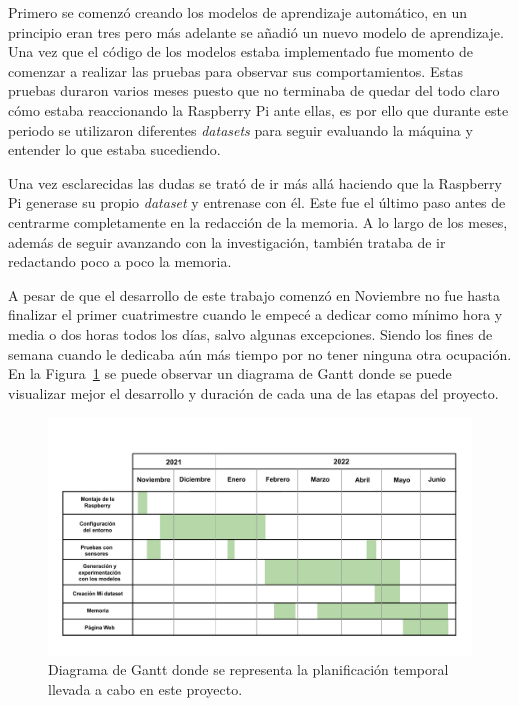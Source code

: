 \documentclass[a4paper, 12pt]{book}
\begin{document}
Primero se comenzó creando los modelos de aprendizaje automático, en un principio eran tres pero más adelante se añadió un nuevo modelo de aprendizaje. Una vez que el código de los modelos estaba implementado fue momento de comenzar a realizar las pruebas para observar sus comportamientos. Estas pruebas duraron varios meses puesto que no terminaba de quedar del todo claro cómo estaba reaccionando la Raspberry Pi ante ellas, es por ello que durante este periodo se utilizaron diferentes \textit{datasets} para seguir evaluando la máquina y entender lo que estaba sucediendo.

Una vez esclarecidas las dudas se trató de ir más allá haciendo que la Raspberry Pi generase su propio \textit{dataset} y entrenase con él. Este fue el último paso antes de centrarme completamente en la redacción de la memoria. A lo largo de los meses, además de seguir avanzando con la investigación, también trataba de ir redactando poco a poco la memoria.

A pesar de que el desarrollo de este trabajo comenzó en Noviembre no fue hasta finalizar el primer cuatrimestre cuando le empecé a dedicar como mínimo hora y media o dos horas todos los días, salvo algunas excepciones. Siendo los fines de semana cuando le dedicaba aún más tiempo por no tener ninguna otra ocupación. En la Figura~\ref{fig:diagrama_gantt} se puede observar un diagrama de Gantt donde se puede visualizar mejor el desarrollo y duración de cada una de las etapas del proyecto.

\begin{figure}[htb]
  \centering
  \includegraphics[width=17cm, keepaspectratio]{img/diagrama_GANTT.pdf}
  \caption{Diagrama de Gantt donde se representa la planificación temporal llevada a cabo en este proyecto.}\label{fig:diagrama_gantt}
\end{figure}
\end{document}
